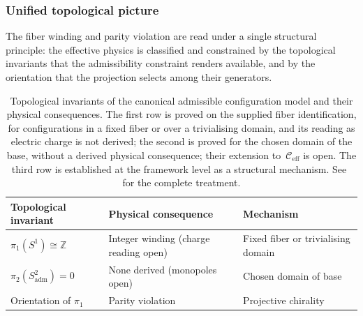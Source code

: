   \subsubsection*{Unified topological picture}
    \label{sec:topological-summary}

    The fiber winding and parity violation are read under a single structural principle: the
    effective physics is classified and constrained by the topological invariants
    that the admissibility constraint renders available, and by the orientation
    that the projection selects among their generators.

    \begin{table}[h]
      \centering
      \begin{tabular}{lll}
        \hline
        Topological invariant           & Physical consequence  & Mechanism                      \\
        \hline
        $\pi_1(S^1) \cong \mathbb{Z}$   & Integer winding (charge reading open) & Fixed fiber or trivialising domain \\
        $\pi_2(S^2_{\mathrm{adm}}) = 0$ & None derived (monopoles open) & Chosen domain of base \\
        Orientation of $\pi_1$          & Parity violation      & Projective chirality           \\
        \hline
      \end{tabular}
      \caption{Topological invariants of the canonical admissible configuration model
      and their physical consequences.
      The first row is proved on the supplied fiber identification, for configurations in a fixed fiber or over a
      trivialising domain, and its reading as electric charge is not derived; the second is proved for the chosen
      domain of the base, without a derived physical consequence; their extension
      to~$\mathcal{C}_{\mathrm{eff}}$ is open.
      The third row is established at the framework level as a structural mechanism.
      See~\cite{Beau2026k} for the complete treatment.}
      \label{tab:topological-invariants}
    \end{table}
